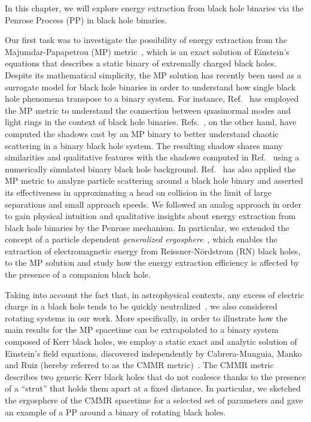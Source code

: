 In this chapter, we will explore energy extraction from black hole binaries via the Penrose Process (PP) in black hole binaries.

Our first task was to investigate the possibility of energy extraction from the Majumdar-Papapetrou (MP) metric~\cite{MAJUMDAR1947,PAPAPETROU1947}, which is an exact solution of Einstein's equations that describes a static binary of extremally charged black holes. Despite its mathematical simplicity, the MP solution has recently been used as a surrogate model for black hole binaries in order to understand how single black hole phenomena transpose to a binary system. For instance, Ref.~\cite{ASSUMPCAO2018} has employed the MP metric to understand the connection between quasinormal modes and light rings in the context of black hole binaries. Refs.~\cite{Shipley:2016omi,Shipley:2019kfq}, on the other hand, have computed the shadows cast by an MP binary to better understand chaotic scattering in a binary black hole system. The resulting shadow shares many similarities and qualitative features with the shadows computed in Ref.~\cite{Bohn:2014xxa} using a numerically simulated binary black hole background. Ref.~\cite{BINI2019} has also applied the MP metric to analyze particle scattering around a black hole binary and asserted its effectiveness in approximating a head on collision in the limit of large separations and small approach speeds. We followed an analog approach in order to gain physical intuition and qualitative insights about energy extraction from black hole binaries by the Penrose mechanism. In particular, we extended the concept of a particle dependent \emph{generalized ergosphere}~\cite{RUFFINI1971}, which enables the extraction of electromagnetic energy from Reissner-N\"ordstrom (RN) black holes, to the MP solution and study how the energy extraction efficiency is affected by the presence of a companion black hole.

Taking into account the fact that, in astrophysical contexts, any excess of electric charge in a black hole tends to be quickly neutralized~\cite{gibbons1975}, we also considered rotating systems in our work. More specifically, in order to illustrate how the main results for the MP spacetime can be extrapolated to a binary system composed of Kerr black holes, we employ a static exact and analytic solution of Einstein's field equations, discovered independently by Cabrera-Munguia, Manko and Ruiz (hereby referred to as the CMMR metric)~\cite{cabrera_metric,manko_ruiz_metric, manko_ruiz_thermo}. The CMMR metric describes two generic Kerr black holes that do not coalesce thanks to the presence of a ``strut'' that holds them apart at a fixed distance. In particular, we sketched the ergosphere of the CMMR spacetime for a selected set of parameters and gave an example of a PP around a binary of rotating black holes.

